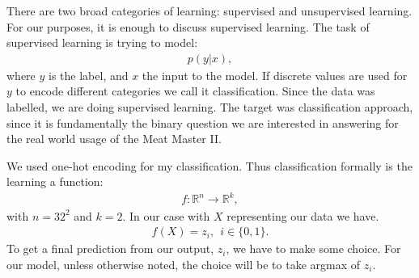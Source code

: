 There are two broad categories of learning: supervised and unsupervised learning. 
For our purposes, it is enough to discuss supervised learning.
The task of supervised learning is trying to model:
\begin{align}
	p(y|x),
\end{align}
where $y$ is the label, and $x$ the input to the model.
If discrete values are used for $y$ to encode different categories we call it classification.
Since the data was labelled, we are doing supervised learning.
The target was classification approach, since it is fundamentally the binary question we are interested in answering for the real world usage of the Meat Master II.


We used one-hot encoding for my classification. Thus classification formally is the learning a function:
\begin{align}
	f: {\mathbb{R}}^n \to \mathbb{R}^k,
\end{align}
with $n=32^2$ and $k=2$. In our case with $X$ representing our data we have.
\begin{align}
	f(X) = z_i, \: \: i \in \{ 0,1 \}.
\end{align}
To get a final prediction from our output, $z_i$, we have to make some choice. 
For our model, unless otherwise noted, the choice will be to take argmax of $z_i$.


